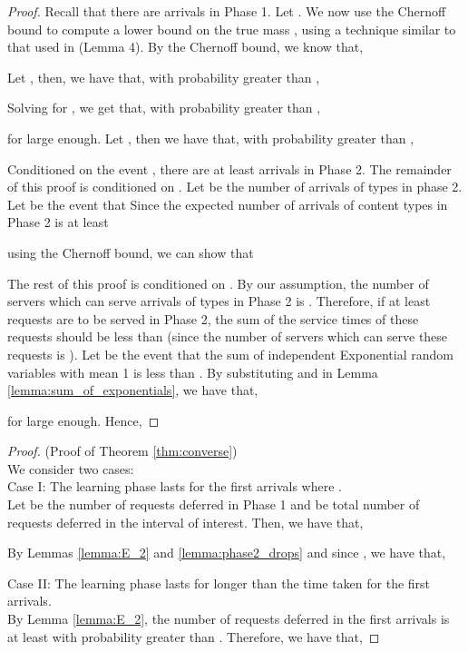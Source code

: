 \documentclass[10pt, conference, letterpaper]{IEEEtran}
\begin{document}
\begin{proof}
	Recall that there are  arrivals in Phase 1. Let . We now use the Chernoff bound to compute a lower bound on the true mass , using a technique similar to that used in \cite{MS00} (Lemma 4). By the Chernoff bound, we know that,
	
	Let , then, we have that, with probability greater than ,
	
	Solving for , we get that, with probability greater than ,

for  large enough.
	Let , then we have that, with probability greater than ,

Conditioned on the event , there are at least  arrivals in Phase 2. The remainder of this proof is conditioned on . Let  be the number of arrivals of types  in phase 2. Let  be the event that
	 Since the expected number of arrivals of content types  in Phase 2 is at least
	
	using the Chernoff bound, we can show that
	
	The rest of this proof is conditioned on .
	By our assumption, the number of servers which can serve arrivals of types  in Phase 2 is . Therefore, if at least  requests are to be served in Phase 2, the sum of the service times of these  requests should be less than  (since the number of servers which can serve these requests is ). Let  be the event that the sum of  independent Exponential random variables with mean 1 is less than . By substituting  and  in Lemma \ref{lemma:sum_of_exponentials}, we have that,
	
	for  large enough. Hence,
	
\end{proof}

\begin{proof} (Proof of Theorem \ref{thm:converse}) \\
	We consider two cases: \\
	Case I: The learning phase lasts for the first  arrivals where . \\
	Let  be the number of requests deferred in Phase 1 and  be total number of requests deferred in the interval of interest. Then, we have that,
	
	By Lemmas \ref{lemma:E_2} and \ref{lemma:phase2_drops} and since , we have that,
	
	Case II: The learning phase lasts for longer than the time taken for the first  arrivals.\\
	By Lemma \ref{lemma:E_2}, the number of requests deferred in the first  arrivals is at least  with probability greater than . Therefore, we have that,
	
\end{proof}
\end{document}
